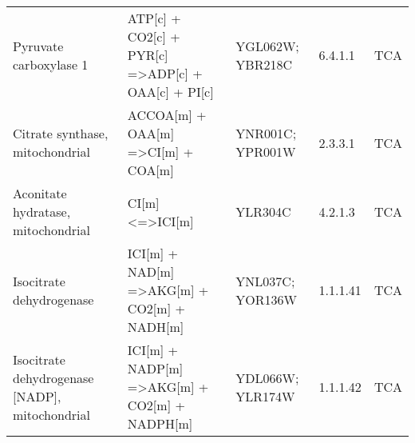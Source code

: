 {\begin{landscape}
\begin{longtable}{p{.25\linewidth} | p{.40\linewidth} | p{.19\linewidth} | p{.05\linewidth} | p{.10\linewidth}}
Pyruvate carboxylase 1                                                                    & ATP{[}c{]} + CO2{[}c{]} + PYR{[}c{]} =\textgreater ADP{[}c{]} + OAA{[}c{]} + PI{[}c{]}                                                          & YGL062W; YBR218C                                                                                                                                                 & 6.4.1.1            & TCA                                                                         \\
Citrate synthase, mitochondrial                                                           & ACCOA{[}m{]} + OAA{[}m{]} =\textgreater CI{[}m{]} + COA{[}m{]}                                                                                  & YNR001C; YPR001W                                                                                                                                                 & 2.3.3.1            & TCA                                                                         \\
Aconitate hydratase, mitochondrial                                                        & CI{[}m{]} \textless{}=\textgreater ICI{[}m{]}                                                                                                   & YLR304C                                                                                                                                                          & 4.2.1.3            & TCA                                                                         \\
Isocitrate dehydrogenase                                                                  & ICI{[}m{]} + NAD{[}m{]} =\textgreater AKG{[}m{]} + CO2{[}m{]} + NADH{[}m{]}                                                                     & YNL037C; YOR136W                                                                                                                                                 & 1.1.1.41           & TCA                                                                         \\
Isocitrate dehydrogenase {[}NADP{]}, mitochondrial                                        & ICI{[}m{]} + NADP{[}m{]} =\textgreater AKG{[}m{]} + CO2{[}m{]} + NADPH{[}m{]}                                                                   & YDL066W; YLR174W                                                                                                                                                 & 1.1.1.42           & TCA                                                                         \\

\end{longtable}
\end{landscape}}
